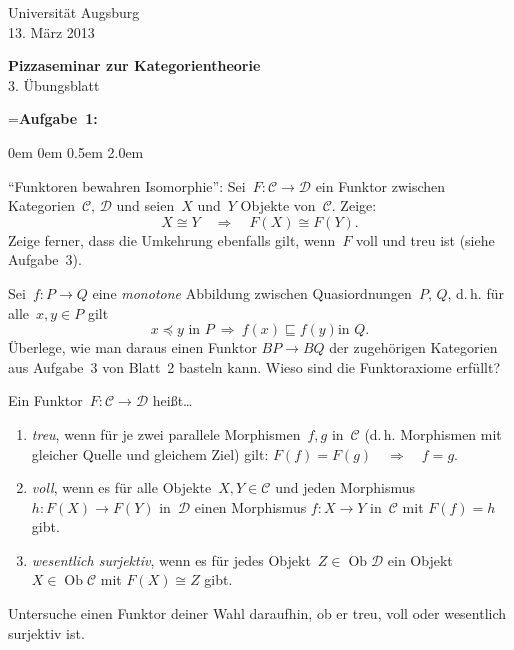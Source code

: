 \documentclass[a4paper,ngerman]{scrartcl}
\theoremstyle{definition}
\theoremstyle{plain}
\theoremstyle{remark}
\newcommand{\C}{\mathcal{C}}
\newcommand{\D}{\mathcal{D}}
\DeclareMathOperator{\Ob}{Ob}
\begin{document}
\vspace*{-4em}
\begin{flushright}Universität Augsburg \\ 13. März 2013\end{flushright}

\begin{center}\Large \textbf{Pizzaseminar zur Kategorientheorie} \\
3. Übungsblatt
\end{center}
\vspace{1.5em}

\newbox{\mybox}
\setbox\mybox=\hbox{\textbf{Aufgabe 1:}}

\begin{list}{}{0em \leftmargin0em \itemindent0.5em \itemsep 2.0em}
\item[\textbf{Aufgabe 1:}]
"`Funktoren bewahren Isomorphie"':
Sei~$F : \C \to \D$ ein Funktor zwischen Kategorien~$\C$, $\D$ und seien~$X$
und~$Y$ Objekte von~$\C$. Zeige:
\[ X \cong Y \quad\Longrightarrow\quad F(X) \cong F(Y). \]
Zeige ferner, dass die Umkehrung ebenfalls gilt, wenn~$F$ voll und treu ist (siehe
Aufgabe~3).

\item[\textbf{Aufgabe 2:}]
Sei~$f:P \to Q$ eine \emph{monotone} Abbildung zwischen Quasiordnungen~$P$,
$Q$, d.\,h. für alle~$x,y \in P$ gilt
\[ \text{$x \preceq y$ in $P$} \ \Longrightarrow\ \text{$f(x) \sqsubseteq f(y)$
in~$Q$}. \]
Überlege, wie man daraus einen Funktor $BP \to BQ$ der zugehörigen Kategorien
aus Aufgabe~3 von Blatt~2 basteln kann. Wieso sind die Funktoraxiome erfüllt?

\item[\textbf{Aufgabe 3:}]
Ein Funktor~$F : \C \to \D$ heißt\ldots
\begin{enumerate}
\item \emph{treu}, wenn für je zwei parallele Morphismen~$f,g$ in~$\C$ (d.\,h.
Morphismen mit gleicher Quelle und gleichem Ziel) gilt:
$F(f) = F(g) \quad\Longrightarrow\quad f = g.$
\item \emph{voll}, wenn es für alle Objekte~$X,Y \in \C$ und jeden
Morphismus~$h : F(X) \to F(Y)$ in~$\D$ einen Morphismus $f:X \to Y$ in~$\C$
mit $F(f) = h$ gibt.
\item \emph{wesentlich surjektiv}, wenn es für jedes Objekt~$Z \in \Ob \D$ ein
Objekt~$X \in \Ob \C$ mit
$F(X) \cong Z$ gibt.
\end{enumerate}
Untersuche einen Funktor deiner Wahl daraufhin, ob er treu, voll oder
wesentlich surjektiv ist.


\end{list}
\end{document}
